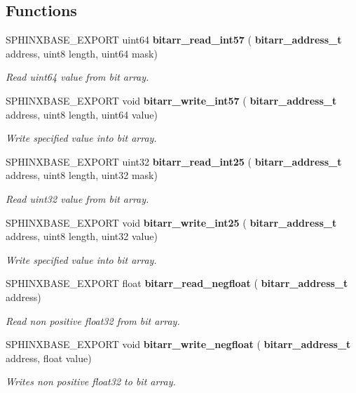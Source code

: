 \subsection*{Functions}
\begin{DoxyCompactItemize}
\item 
S\+P\+H\+I\+N\+X\+B\+A\+S\+E\+\_\+\+E\+X\+P\+O\+RT uint64 \textbf{ bitarr\+\_\+read\+\_\+int57} (\textbf{ bitarr\+\_\+address\+\_\+t} address, uint8 length, uint64 mask)
\begin{DoxyCompactList}\small\item\em Read uint64 value from bit array. \end{DoxyCompactList}\item 
S\+P\+H\+I\+N\+X\+B\+A\+S\+E\+\_\+\+E\+X\+P\+O\+RT void \textbf{ bitarr\+\_\+write\+\_\+int57} (\textbf{ bitarr\+\_\+address\+\_\+t} address, uint8 length, uint64 value)
\begin{DoxyCompactList}\small\item\em Write specified value into bit array. \end{DoxyCompactList}\item 
S\+P\+H\+I\+N\+X\+B\+A\+S\+E\+\_\+\+E\+X\+P\+O\+RT uint32 \textbf{ bitarr\+\_\+read\+\_\+int25} (\textbf{ bitarr\+\_\+address\+\_\+t} address, uint8 length, uint32 mask)
\begin{DoxyCompactList}\small\item\em Read uint32 value from bit array. \end{DoxyCompactList}\item 
S\+P\+H\+I\+N\+X\+B\+A\+S\+E\+\_\+\+E\+X\+P\+O\+RT void \textbf{ bitarr\+\_\+write\+\_\+int25} (\textbf{ bitarr\+\_\+address\+\_\+t} address, uint8 length, uint32 value)
\begin{DoxyCompactList}\small\item\em Write specified value into bit array. \end{DoxyCompactList}\item 
S\+P\+H\+I\+N\+X\+B\+A\+S\+E\+\_\+\+E\+X\+P\+O\+RT float \textbf{ bitarr\+\_\+read\+\_\+negfloat} (\textbf{ bitarr\+\_\+address\+\_\+t} address)
\begin{DoxyCompactList}\small\item\em Read non positive float32 from bit array. \end{DoxyCompactList}\item 
S\+P\+H\+I\+N\+X\+B\+A\+S\+E\+\_\+\+E\+X\+P\+O\+RT void \textbf{ bitarr\+\_\+write\+\_\+negfloat} (\textbf{ bitarr\+\_\+address\+\_\+t} address, float value)
\begin{DoxyCompactList}\small\item\em Writes non positive float32 to bit array. \end{DoxyCompactList}\item 

\end{DoxyCompactItemize}
